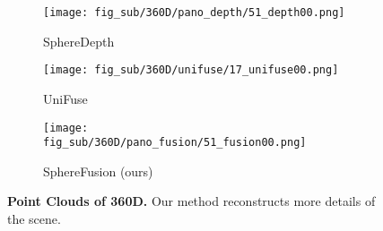 \begin{figure*}[t]
	\begin{subfigure}{0.3\linewidth}
		\texttt{[image: fig\_sub/360D/pano\_depth/51\_depth00.png]}
		\caption{SphereDepth \cite{yan2022spheredepth}}
	\end{subfigure}
	\begin{subfigure}{0.3\linewidth}
		\texttt{[image: fig\_sub/360D/unifuse/17\_unifuse00.png]}
		\caption{UniFuse \cite{jiang2021unifuse}}
	\end{subfigure}
	\begin{subfigure}{0.3\linewidth}
		\texttt{[image: fig\_sub/360D/pano\_fusion/51\_fusion00.png]}
		\caption{SphereFusion (ours)}
	\end{subfigure}	
	
	
	\caption{
		\textbf{Point Clouds of 360D.} Our method reconstructs more details of the scene.
	}
	\label{fig:3d60_cloud}
    \vspace{-1.0em}
\end{figure*}

\FloatBarrier

